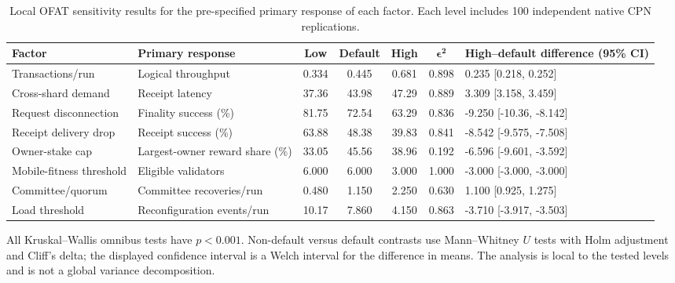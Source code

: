 \begin{table}[pos=t]
\centering
\caption{Local OFAT sensitivity results for the pre-specified primary response of each factor. Each level includes 100 independent native CPN replications.}
\label{tab:sensitivity_primary}
\scriptsize
\setlength{\tabcolsep}{2.6pt}
\renewcommand{\arraystretch}{1.10}
\begin{tabularx}{\textwidth}{p{2.55cm}p{2.55cm}ccccl}
\toprule
\textbf{Factor} & \textbf{Primary response} & \textbf{Low} & \textbf{Default} & \textbf{High} & $\boldsymbol{\epsilon^2}$ & \textbf{High--default difference (95\% CI)}\\
\midrule
Transactions/run & Logical throughput & 0.334 & 0.445 & 0.681 & 0.898 & 0.235 [0.218, 0.252]\\
Cross-shard demand & Receipt latency & 37.36 & 43.98 & 47.29 & 0.889 & 3.309 [3.158, 3.459]\\
Request disconnection & Finality success (\%) & 81.75 & 72.54 & 63.29 & 0.836 & -9.250 [-10.36, -8.142]\\
Receipt delivery drop & Receipt success (\%) & 63.88 & 48.38 & 39.83 & 0.841 & -8.542 [-9.575, -7.508]\\
Owner-stake cap & Largest-owner reward share (\%) & 33.05 & 45.56 & 38.96 & 0.192 & -6.596 [-9.601, -3.592]\\
Mobile-fitness threshold & Eligible validators & 6.000 & 6.000 & 3.000 & 1.000 & -3.000 [-3.000, -3.000]\\
Committee/quorum & Committee recoveries/run & 0.480 & 1.150 & 2.250 & 0.630 & 1.100 [0.925, 1.275]\\
Load threshold & Reconfiguration events/run & 10.17 & 7.860 & 4.150 & 0.863 & -3.710 [-3.917, -3.503]\\
\bottomrule
\end{tabularx}
\begin{minipage}{0.98\textwidth}\footnotesize
All Kruskal--Wallis omnibus tests have $p<0.001$. Non-default versus default contrasts use Mann--Whitney $U$ tests with Holm adjustment and Cliff's delta; the displayed confidence interval is a Welch interval for the difference in means. The analysis is local to the tested levels and is not a global variance decomposition.
\end{minipage}
\end{table}
